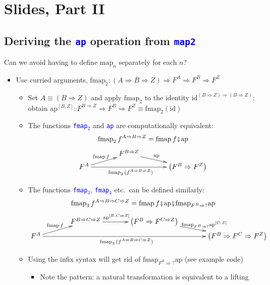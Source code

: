 \section{Slides, Part II}

\subsection{Deriving the \texttt{\textcolor{blue}{\footnotesize{}ap}} operation
from \texttt{\textcolor{blue}{\footnotesize{}map2}} }

\vspace{-0.1cm}Can we avoid having to define $\text{map}_{n}$ separately
for each $n$?
\begin{itemize}
\item Use curried arguments, $\text{fmap}_{2}:(A\Rightarrow B\Rightarrow Z)\Rightarrow F^{A}\Rightarrow F^{B}\Rightarrow F^{Z}$
\begin{itemize}
\item Set $A\equiv\left(B\Rightarrow Z\right)$ and apply $\text{fmap}_{2}$
to the identity $\text{id}^{\left(B\Rightarrow Z\right)\Rightarrow\left(B\Rightarrow Z\right)}$:
obtain $\text{ap}^{[B,Z]}:F^{B\Rightarrow Z}\Rightarrow F^{B}\Rightarrow F^{Z}\equiv\text{fmap}_{2}\left(\text{id}\right)$
\item The functions \texttt{\textcolor{blue}{\footnotesize{}fmap$_{2}$}}
and \texttt{\textcolor{blue}{\footnotesize{}ap}} are computationally
equivalent:{\footnotesize{}
\[
\text{fmap}_{2}\,f^{A\Rightarrow B\Rightarrow Z}=\text{fmap}\,f\bef\text{ap}
\]
\[
\xymatrix{\xyScaleY{0.2pc}\xyScaleX{3pc} & F^{B\Rightarrow Z}\ar[rd]\sp(0.45){\text{ap}}\\
F^{A}\ar[ru]\sp(0.45){\text{fmap}\,f}\ar[rr]\sb(0.45){\text{fmap}_{2}\,(f^{A\Rightarrow B\Rightarrow Z})} &  & \left(F^{B}\Rightarrow F^{Z}\right)
}
\]
}{\footnotesize\par}
\item The functions \texttt{\textcolor{blue}{\footnotesize{}fmap$_{3}$}},
\texttt{\textcolor{blue}{\footnotesize{}fmap$_{4}$}} etc.\ can be
defined similarly:{\footnotesize{}
\[
\text{fmap}_{3}\,f^{A\Rightarrow B\Rightarrow C\Rightarrow Z}=\text{fmap}\,f\bef\text{ap}\bef\text{fmap}_{F^{B}\Rightarrow?}\text{ap}
\]
\[
\xymatrix{\xyScaleY{0.2pc}\xyScaleX{3pc} & F^{B\Rightarrow C\Rightarrow Z}\ar[r]\sp(0.45){\text{ap}^{[B,C\Rightarrow Z]}} & \left(F^{B}\Rightarrow F^{C\Rightarrow Z}\right)\ar[rd]\sp(0.55){\text{fmap}_{F^{B}\Rightarrow?}\text{ap}^{[C,Z]}}\\
F^{A}\ar[ru]\sp(0.45){\text{fmap}\,f}\ar[rrr]\sb(0.45){\text{fmap}_{3}\,(f^{A\Rightarrow B\Rightarrow C\Rightarrow Z})} &  &  & \left(F^{B}\Rightarrow F^{C}\Rightarrow F^{Z}\right)
}
\]
}{\footnotesize\par}
\item Using the infix syntax will get rid of {\footnotesize{}$\text{fmap}_{F^{B}\Rightarrow?}\text{ap}$}
(see example code)
\begin{itemize}
\item Note the pattern: a natural transformation is equivalent to a lifting
\end{itemize}
\end{itemize}
\end{itemize}


